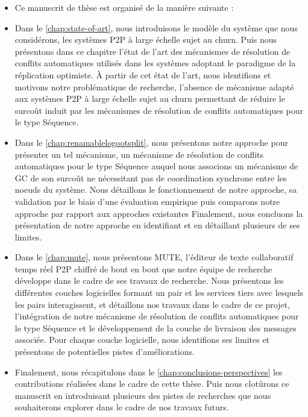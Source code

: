 \begin{itemize}
    \item Ce manuscrit de thèse est organisé de la manière suivante :
    \item Dans le \autoref{chap:state-of-art}, nous introduisons le modèle du système que nous considérons, \ie les systèmes \ac{P2P} à large échelle sujet au churn.
        Puis nous présentons dans ce chapitre l'état de l'art des mécanismes de résolution de conflits automatiques utilisés dans les systèmes adoptant le paradigme de la réplication optimiste.
        À partir de cet état de l'art, nous identifions et motivons notre problématique de recherche, \ie l'absence de mécanisme adapté aux systèmes \ac{P2P} à large échelle sujet au churn permettant de réduire le surcoût induit par les mécanismes de résolution de conflits automatiques pour le type Séquence.
    \item Dans le \autoref{chap:renamablelogootsplit}, nous présentons notre approche pour présenter un tel mécanisme, \ie un mécanisme de résolution de conflits automatiques pour le type Séquence auquel nous associons un mécanisme de \ac{GC} de son surcoût ne nécessitant pas de coordination synchrone entre les noeuds du système.
        Nous détaillons le fonctionnement de notre approche, sa validation par le biais d'une évaluation empirique puis comparons notre approche par rapport aux approches existantes
        Finalement, nous concluons la présentation de notre approche en identifiant et en détaillant plusieurs de ses limites.
    \item Dans le \autoref{chap:mute}, nous présentons \ac{MUTE}, l'éditeur de texte collaboratif temps réel \ac{P2P} chiffré de bout en bout que notre équipe de recherche développe dans le cadre de ses travaux de recherche.
        Nous présentons les différentes couches logicielles formant un pair et les services tiers avec lesquels les pairs interagissent, et détaillons nos travaux dans le cadre de ce projet, \ie l'intégration de notre mécanisme de résolution de conflits automatiques pour le type Séquence et le développement de la couche de livraison des messages associée.
        Pour chaque couche logicielle, nous identifions ses limites et présentons de potentielles pistes d'améliorations.
    \item Finalement, nous récapitulons dans le \autoref{chap:conclusions-perspectives} les contributions réalisées dans le cadre de cette thèse.
        Puis nous clotûrons ce manuscrit en introduisant plusieurs des pistes de recherches que nous souhaiterons explorer dans le cadre de nos travaux futurs.
\end{itemize}

